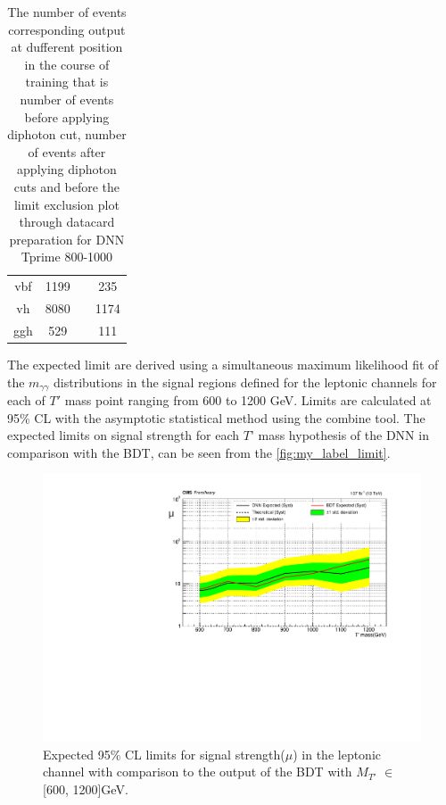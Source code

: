 \begin{table}[h]
{\begin{tabular}{|cccc|}
       vbf        &     1199      &         &    235      \\
        vh              &   8080        &         &    1174      \\        
        ggh       &    529       &         &      111    \\ \hline
    \end{tabular}}
    \caption{The number of events corresponding output at dufferent position in the course of training that is number of events before applying diphoton cut, number of events after applying diphoton cuts and before the limit exclusion plot through datacard preparation for DNN Tprime 800-1000}
    \label{tab:my_label_table_11}
\end{table}













The expected limit are derived using a simultaneous maximum likelihood fit of the $m_{\gamma\gamma}$ distributions in the signal regions defined for the leptonic channels for each of $T'$ mass point ranging from 600 to 1200 GeV. Limits are calculated at 95\% CL with the asymptotic statistical method using the combine tool. The expected limits on signal strength for each $T’$ mass hypothesis of the DNN in comparison with the BDT, can be seen  from the \autoref{fig:my_label_limit}. 

\begin{figure}[H]
    \centering
    \includegraphics[scale=0.8]{figure_4/muALL_Plot_600-1200_1.pdf}
    \caption{Expected 95\% CL limits for signal strength($\mu$) in the leptonic channel with comparison to the output of the BDT with $M_{T'}$ $\in$ [600, 1200]GeV.}
    \label{fig:my_label_limit}
\end{figure}

